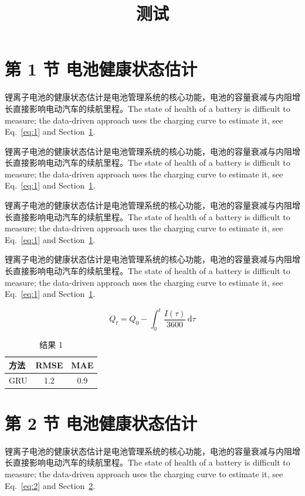 \documentclass[UTF8,fontset=mac]{ctexart}
\title{测试}
\begin{document}
\maketitle
\tableofcontents
\section{第 1 节 电池健康状态估计}\label{sec:1}
锂离子电池的健康状态估计是电池管理系统的核心功能，电池的容量衰减与内阻增长直接影响电动汽车的续航里程\cite{a2020}。The state of health of a battery is difficult to measure; the data-driven approach uses the charging curve to estimate it, see Eq.~\eqref{eq:1} and Section~\ref{sec:1}.

锂离子电池的健康状态估计是电池管理系统的核心功能，电池的容量衰减与内阻增长直接影响电动汽车的续航里程\cite{a2020}。The state of health of a battery is difficult to measure; the data-driven approach uses the charging curve to estimate it, see Eq.~\eqref{eq:1} and Section~\ref{sec:1}.

锂离子电池的健康状态估计是电池管理系统的核心功能，电池的容量衰减与内阻增长直接影响电动汽车的续航里程\cite{a2020}。The state of health of a battery is difficult to measure; the data-driven approach uses the charging curve to estimate it, see Eq.~\eqref{eq:1} and Section~\ref{sec:1}.

锂离子电池的健康状态估计是电池管理系统的核心功能，电池的容量衰减与内阻增长直接影响电动汽车的续航里程\cite{a2020}。The state of health of a battery is difficult to measure; the data-driven approach uses the charging curve to estimate it, see Eq.~\eqref{eq:1} and Section~\ref{sec:1}.

\begin{equation}\label{eq:1}
  Q_t = Q_0 - \int_0^t \frac{I(\tau)}{3600}\,\mathrm{d}\tau
\end{equation}
\begin{table}[h]\centering\begin{tabular}{lcc}\toprule 方法 & RMSE & MAE\\\midrule GRU & 1.2 & 0.9\\\bottomrule\end{tabular}\caption{结果 1}\end{table}

\section{第 2 节 电池健康状态估计}\label{sec:2}
锂离子电池的健康状态估计是电池管理系统的核心功能，电池的容量衰减与内阻增长直接影响电动汽车的续航里程\cite{a2020}。The state of health of a battery is difficult to measure; the data-driven approach uses the charging curve to estimate it, see Eq.~\eqref{eq:2} and Section~\ref{sec:2}.
\end{document}
